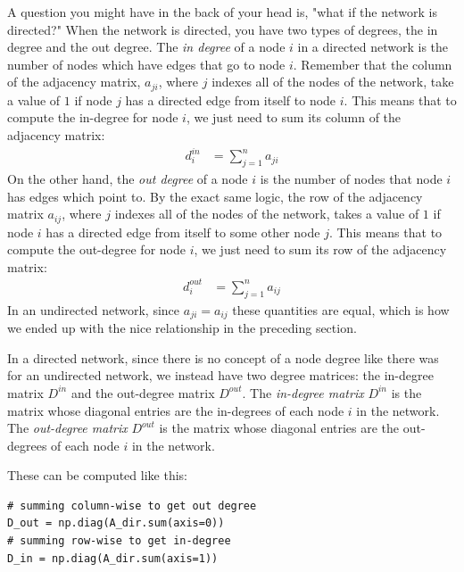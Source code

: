 A question you might have in the back of your head is, "what if the network is directed?" When the network is directed, you have two types of degrees, the {in degree} and the {out degree}. The \textit{in degree} of a node $i$ in a directed network is the number of nodes which have edges that go {to} node $i$. Remember that the column of the adjacency matrix, $a_{ji}$, where $j$ indexes all of the nodes of the network, take a value of $1$ if node $j$ has a directed edge from itself to node $i$. This means that to compute the in-degree for node $i$, we just need to sum its column of the adjacency matrix:
\begin{align*}
    d_i^{in} &= \sum_{j = 1}^n a_{ji}
\end{align*}
On the other hand, the \textit{out degree} of a node $i$ is the number of nodes that node $i$ has edges which point to. By the exact same logic, the row of the adjacency matrix $a_{ij}$, where $j$ indexes all of the nodes of the network, takes a value of $1$ if node $i$ has a directed edge from itself to some other node $j$. This means that to compute the out-degree for node $i$, we just need to sum its row of the adjacency matrix:
\begin{align*}
    d_i^{out} &= \sum_{j = 1}^n a_{ij}
\end{align*}
In an undirected network, since $a_{ji} = a_{ij}$ these quantities are equal, which is how we ended up with the nice relationship in the preceding section. 

In a directed network, since there is no concept of a {node degree} like there was for an undirected network, we instead have two degree matrices: the {in-degree matrix} $D^{in}$ and the {out-degree matrix} $D^{out}$. The \textit{in-degree matrix} $D^{in}$ is the matrix whose diagonal entries are the in-degrees of each node $i$ in the network. The \textit{out-degree matrix} $D^{out}$ is the matrix whose diagonal entries are the out-degrees of each node $i$ in the network. 

These can be computed like this:

\begin{lstlisting}[style=python]
# summing column-wise to get out degree
D_out = np.diag(A_dir.sum(axis=0))
# summing row-wise to get in-degree
D_in = np.diag(A_dir.sum(axis=1))
\end{lstlisting}

